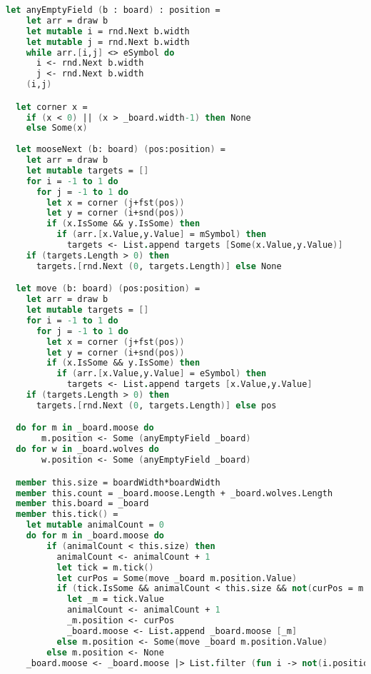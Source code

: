 \begin{lstlisting}[language=FSharp]
  let anyEmptyField (b : board) : position =
    let arr = draw b
    let mutable i = rnd.Next b.width
    let mutable j = rnd.Next b.width
    while arr.[i,j] <> eSymbol do
      i <- rnd.Next b.width
      j <- rnd.Next b.width
    (i,j)

  let corner x =
    if (x < 0) || (x > _board.width-1) then None
    else Some(x)
    
  let mooseNext (b: board) (pos:position) =
    let arr = draw b
    let mutable targets = []
    for i = -1 to 1 do
      for j = -1 to 1 do
        let x = corner (j+fst(pos))
        let y = corner (i+snd(pos))
        if (x.IsSome && y.IsSome) then
          if (arr.[x.Value,y.Value] = mSymbol) then
            targets <- List.append targets [Some(x.Value,y.Value)]
    if (targets.Length > 0) then
      targets.[rnd.Next (0, targets.Length)] else None

  let move (b: board) (pos:position) =
    let arr = draw b
    let mutable targets = []
    for i = -1 to 1 do
      for j = -1 to 1 do
        let x = corner (j+fst(pos))
        let y = corner (i+snd(pos))
        if (x.IsSome && y.IsSome) then
          if (arr.[x.Value,y.Value] = eSymbol) then
            targets <- List.append targets [x.Value,y.Value]
    if (targets.Length > 0) then
      targets.[rnd.Next (0, targets.Length)] else pos

  do for m in _board.moose do
       m.position <- Some (anyEmptyField _board)
  do for w in _board.wolves do
       w.position <- Some (anyEmptyField _board)

  member this.size = boardWidth*boardWidth
  member this.count = _board.moose.Length + _board.wolves.Length
  member this.board = _board
  member this.tick() =
    let mutable animalCount = 0
    do for m in _board.moose do
        if (animalCount < this.size) then
          animalCount <- animalCount + 1
          let tick = m.tick()
          let curPos = Some(move _board m.position.Value)
          if (tick.IsSome && animalCount < this.size && not(curPos = m.position)) then
            let _m = tick.Value
            animalCount <- animalCount + 1
            _m.position <- curPos
            _board.moose <- List.append _board.moose [_m]
          else m.position <- Some(move _board m.position.Value)
        else m.position <- None
    _board.moose <- _board.moose |> List.filter (fun i -> not(i.position = None))


\end{lstlisting}
